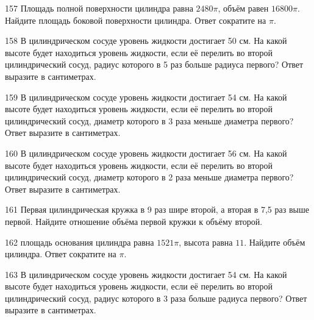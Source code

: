 \documentclass[4apaper]{article}
\begin{document}
\begin{taskBN}{157}
Площадь полной поверхности цилиндра равна $2480\pi$, объём равен $16800\pi$. Найдите площадь боковой поверхности цилиндра. Ответ сократите на $\pi$.
\end{taskBN}

\begin{taskBN}{158}
В цилиндрическом сосуде уровень жидкости достигает 50 см. На какой высоте будет находиться уровень жидкости, если её перелить во второй цилиндрический сосуд, радиус которого в 5 раз больше радиуса первого? Ответ выразите в сантиметрах.
\end{taskBN}

\begin{taskBN}{159}
В цилиндрическом сосуде уровень жидкости достигает 54 см. На какой высоте будет находиться уровень жидкости, если её перелить во второй цилиндрический сосуд, диаметр которого в 3 раза меньше диаметра первого? Ответ выразите в сантиметрах.
\end{taskBN}

\begin{taskBN}{160}
В цилиндрическом сосуде уровень жидкости достигает 56 см. На какой высоте будет находиться уровень жидкости, если её перелить во второй цилиндрический сосуд, диаметр которого в 2 раза меньше диаметра первого? Ответ выразите в сантиметрах.
\end{taskBN}

\begin{taskBN}{161}
 Первая цилиндрическая кружка в 9 раз шире второй, а вторая в 7,5 раз выше первой. Найдите отношение объёма первой кружки к объёму второй.
\end{taskBN}

\begin{taskBN}{162}
площадь основания цилиндра равна $1521\pi$, высота равна $11$. Найдите объём цилиндра. Ответ сократите на $\pi$.
\end{taskBN}

\begin{taskBN}{163}
В цилиндрическом сосуде уровень жидкости достигает 54 см. На какой высоте будет находиться уровень жидкости, если её перелить во второй цилиндрический сосуд, радиус которого в 3 раза больше радиуса первого? Ответ выразите в сантиметрах.
\end{taskBN}
\end{document}
